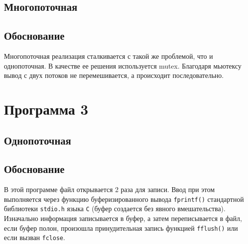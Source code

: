 \subsection{Многопоточная}

\begin{center}
    \captionsetup{justification=raggedright,singlelinecheck=off}
    
\end{center}


\subsection{Обоснование}

Многопоточная реализация сталкивается с такой же проблемой, что и однопоточная. В качестве ее решения используется mutex. Благодаря мьютексу вывод с двух потоков не перемешивается, а происходит последовательно.





\section{Программа 3}

\subsection{Однопоточная}

\begin{center}
    \captionsetup{justification=raggedright,singlelinecheck=off}
    
\end{center}


\subsection{Обоснование}

В этой программе файл открывается 2 раза для записи. Ввод при этом выполняется через функцию буферизированного вывода \texttt{fprintf()} стандартной библиотеки \texttt{stdio.h} языка \texttt{С} (буфер создается без явного вмешательства). Изначально информация записывается в буфер, а затем переписывается в файл, если буфер полон, произошла принудительная запись функцией \texttt{fflush()} или если вызван \texttt{fclose}.


